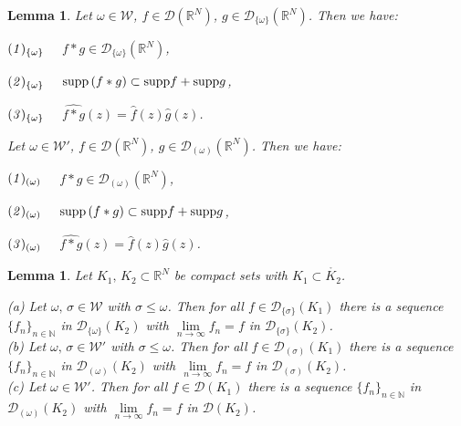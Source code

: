 \documentclass[twoside]{amsart}
\newtheorem{Lemma}[Th]{Lemma}
\begin{document}
\begin{Lemma}
Let $\omega\in{\mathcal{W}}$, $f\in{\mathcal{D}}({\mathbb R}^N)$, $g\in{\mathcal{D}}_{\{\omega\}}({\mathbb R}^N)$.
Then we have:

${\displaystyle}{\it (1)_{\{\omega\}}}$
$\quad f*g\in{\mathcal{D}}_{\{\omega\}}({\mathbb R}^N)$,

${\displaystyle}{\it (2)_{\{\omega\}}}$
$\quad{\mathop{\rm supp}\nolimits}\, (f*g)\subset{\mathop{\rm supp}\nolimits} f+{\mathop{\rm supp}\nolimits} g$,

${\displaystyle}{\it (3)_{\{\omega\}}}$
$\quad\widehat{f*g}(z)=\hat{f}(z)\hat{g}(z)$.

\vspace*{1.5mm}
\noindent
Let $\omega\in{\mathcal{W}}'$, $f\in{\mathcal{D}}({\mathbb R}^N)$, $g\in{\mathcal{D}}_{(\omega)}({\mathbb R}^N)$.
Then we have:

\vspace*{1mm}
${\displaystyle}{\it (1)_{(\omega)}}$ $\quad f*g\in{\mathcal{D}}_{(\omega)}({\mathbb R}^N)$,

${\displaystyle}{\it (2)_{(\omega)}}$ $\quad{\mathop{\rm supp}\nolimits}\,(f*g)\subset{\mathop{\rm supp}\nolimits} f+{\mathop{\rm supp}\nolimits} g$,

${\displaystyle}{\it (3)_{(\omega)}}$ $\quad\widehat{f*g}(z)=\hat{f}(z)\hat{g}(z)$.
\end{Lemma}

\begin{Lemma}
\label{lem:3.8}
Let $K_{1},\,K_{2}\subset{\mathbb R}^N$ be compact sets with 
$K_{1}\subset\mathring{K_{2}}$.

(a) Let $\omega,\,\sigma\in{\mathcal{W}}$ with $\sigma\leq\omega$. Then
for all $f\in{\mathcal{D}}_{\{\sigma\}}(K_{1})$ there is a sequence 
$\{f_{n}\}_{n\in\mathbb{N}}$
in ${\mathcal{D}}_{\{\omega\}}(K_{2})$ with $\underset{n\rightarrow\infty}{\lim}f_{n}=f$
in ${\mathcal{D}}_{\{\sigma\}}(K_{2})$.\\

(b) Let $\omega,\,\sigma\in{\mathcal{W}}'$ with $\sigma\leq\omega$. Then
for all $f\in{\mathcal{D}}_{(\sigma)}(K_{1})$ there is a sequence 
$\{f_{n}\}_{n\in\mathbb{N}}$
in ${\mathcal{D}}_{(\omega)}(K_{2})$ with $\underset{n\rightarrow\infty}{\lim}f_{n}=f$
in ${\mathcal{D}}_{(\sigma)}(K_{2})$.\\

(c) Let $\omega\in{\mathcal{W}}'$. Then for all $f\in{\mathcal{D}}(K_{1})$ there
is a sequence $\{f_{n}\}_{n\in\mathbb{N}}$ in ${\mathcal{D}}_{(\omega)}(K_{2})$
with $\underset{n\rightarrow\infty}{\lim}f_{n}=f$ in ${\mathcal{D}}(K_{2})$.
\end{Lemma}
\end{document}
